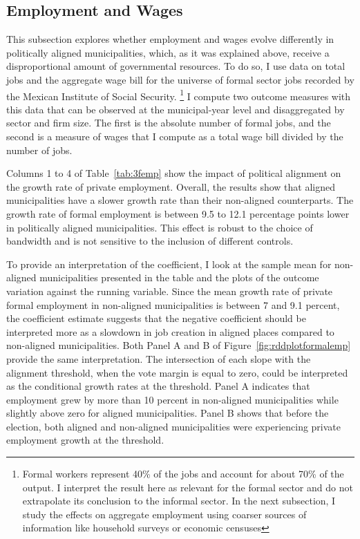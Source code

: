 \documentclass[dv_diss_main.tex]{subfiles}
\begin{document}
\subsection{Employment and Wages}

This subsection explores whether employment and wages evolve differently in politically aligned municipalities, which, as it was explained above, receive a disproportional amount of governmental resources.  To do so, I use data on total jobs and the aggregate wage bill for the universe of formal sector jobs recorded by the Mexican Institute of Social Security.
\footnote{ Formal workers represent 40\% of the jobs and account for about 70\% of the output. I interpret the result here as relevant for the formal sector and do not extrapolate its conclusion to the informal sector. In the next subsection, I study the effects on aggregate employment using coarser sources of information like household surveys or economic censuses} 
I compute two outcome measures with this data that can be observed at the municipal-year level and disaggregated by sector and firm size. The first is the absolute number of formal jobs, and the second is a measure of wages that I compute as a total wage bill divided by the number of jobs.

Columns 1 to 4 of Table~\ref{tab:3femp} show the impact of political alignment on the growth rate of private employment. Overall, the results show that aligned municipalities have a slower growth rate than their non-aligned counterparts.  The growth rate of formal employment is between 9.5 to 12.1 percentage points lower in politically aligned municipalities. This effect is robust to the choice of bandwidth and is not sensitive to the inclusion of different controls. 

To provide an interpretation of the coefficient, I look at the sample mean for non-aligned municipalities presented in the table and the plots of the outcome variation against the running variable. Since the mean growth rate of private formal employment in non-aligned municipalities is between 7 and 9.1 percent, the coefficient estimate suggests that the negative coefficient should be interpreted more as a slowdown in job creation in aligned places compared to non-aligned municipalities. Both Panel A and B of Figure~\ref{fig:rddplotformalemp} provide the same interpretation. The intersection of each slope with the alignment threshold, when the vote margin is equal to zero, could be interpreted as the conditional growth rates at the threshold. Panel A indicates that employment grew by more than 10 percent in non-aligned municipalities while slightly above zero for aligned municipalities. Panel B shows that before the election, both aligned and non-aligned municipalities were experiencing private employment growth at the threshold.
\end{document}
